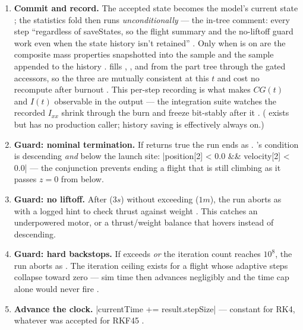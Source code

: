 \begin{enumerate}
  .
\item \textbf{Commit and record.} The accepted state becomes the model's current state
  ; the statistics fold then runs \emph{unconditionally} --- the
  in-tree comment: every step ``regardless of saveStates, so the flight summary and the
  no-liftoff guard work even when the state history isn't retained''
  . Only when  is on are the composite mass
  properties snapshotted into the sample and the sample appended to the history
  .  fills ,
  , and  from the part tree through the gated accessors, so the
  three are mutually consistent at this $t$ and cost no recompute after burnout
  . This per-step recording is what makes $CG(t)$ and $I(t)$
  observable in the output --- the integration suite watches the recorded $I_{xx}$ shrink
  through the burn and freeze bit-stably after it .
  ( exists  but has no production caller;
  history saving is effectively always on.)
\item \textbf{Guard: nominal termination.} If  returns true the run
  ends as  . 's condition is
  descending \emph{and} below the launch site: \cppinline|position[2] < 0.0 && velocity[2] < 0.0|
   --- the conjunction prevents ending a flight that is still
  climbing as it passes $z=0$ from below.
\item \textbf{Guard: no liftoff.} After  ($3\unit{s}$) without
   exceeding  ($1\unit{m}$), the run aborts as
   with a logged hint to check thrust against weight
  . This catches an underpowered motor, or a thrust/weight balance
  that hovers instead of descending.
\item \textbf{Guard: hard backstops.} If  exceeds 
  \emph{or} the iteration count reaches $10^{8}$, the run aborts as 
  . The iteration ceiling exists for a flight whose adaptive steps
  collapse toward zero --- sim time then advances negligibly and the time cap alone would never
  fire .
\item \textbf{Advance the clock.} \cppinline|currentTime += result.stepSize| ---
  constant  for RK4, whatever was accepted for RKF45 .
\end{enumerate}

